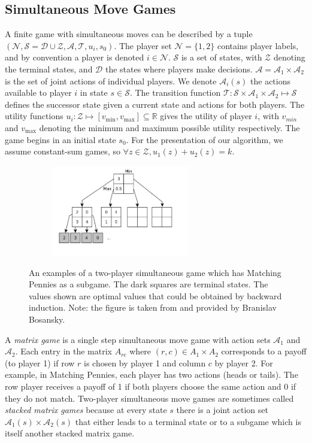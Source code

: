 \documentclass[conference]{IEEEtran}
\newcommand{\cA}{\mathcal{A}}
\newcommand{\cD}{\mathcal{D}}
\newcommand{\cN}{\mathcal{N}}
\newcommand{\cS}{\mathcal{S}}
\newcommand{\cT}{\mathcal{T}}
\newcommand{\cZ}{\mathcal{Z}}
\begin{document}
\subsection{Simultaneous Move Games}

A finite game with simultaneous moves can be described by a tuple 
$(\cN, \cS = \cD \cup \cZ, \cA, \cT, u_i, s_0)$. The player set $\cN = \{ 1, 2 \}$ contains player 
labels, and by convention a player is denoted $i \in \cN$.
$\cS$ is a set of states, with $\cZ$ denoting the terminal states, and $\cD$ the states where players make decisions.
$\cA = \cA_1 \times \cA_2$ is the set of joint actions of individual players. We denote $\cA_i(s)$ the actions available 
to player $i$ in state $s \in \cS$. The 
transition function $\cT : \cS \times \cA_1 \times \cA_2 \mapsto \cS$ defines the successor state given a current 
state and actions for both players. The utility functions 
$u_i : \cZ \mapsto [v_{\min}, v_{\max}] \subseteq \mathbb{R}$ gives the utility of player $i$, with 
$v_{min}$ and $v_{\max}$ denoting the minimum and maximum possible utility respectively. 
The game begins in an initial state $s_0$. For the presentation of our algorithm, we assume constant-sum games, so
$\forall z \in \cZ, u_1(z) + u_2(z) = k$. 


\begin{figure}[t!]
\centering
\begin{subfigure}{6cm}
\centering
\includegraphics[width=6.0cm]{figures/tree}\\
\end{subfigure}
\caption{An examples of a two-player simultaneous game which has Matching Pennies as a subgame.
The dark squares are terminal states. The values shown are optimal values that could be obtained by backward induction.
{\small Note: the figure is taken from \cite{Lanctot13Goofspiel} and provided by Branislav Bosansky.}
\label{fig:example}}
\end{figure}

A {\it matrix game} is a single step simultaneous move game with action sets $\cA_1$ and $\cA_2$. 
Each entry in the matrix $A_{rc}$ where $(r,c) \in A_1 \times A_2$ corresponds to a payoff (to player 1) if row $r$ is chosen by player 1 and column $c$ by player 2. 
For example, in Matching Pennies, each player has two actions (heads or tails). The row player receives a payoff of 1 if both players choose the same action and 0 if they do not match. 
Two-player simultaneous move games are sometimes called {\it stacked matrix games} because at every state 
$s$ there is a joint action set $\cA_1(s) \times \cA_2(s)$ that either leads to a terminal state or to a subgame which 
is itself another stacked matrix game. 
\end{document}
